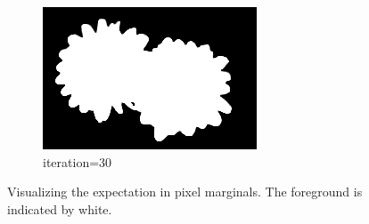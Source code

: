 \documentclass{article}
\begin{document}
\begin{figure}[t]
\begin{subfigure}[t]{0.19\textwidth}
\includegraphics[width=\textwidth]{./images/marginals_iter_30.png}
\vspace{-0.6cm}
\caption{iteration=30}
\end{subfigure}

%
\caption{Visualizing the expectation in pixel marginals. The foreground is indicated by white.}
\label{f:52d}
\end{figure}
\end{document}
